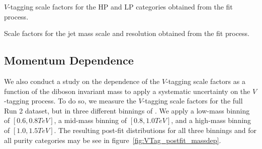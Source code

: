 \begin{table}[htbp]
  \centering
  
  \caption{
    $V$-tagging scale factors for the HP and LP categories obtained from the fit process.
  }
  \label{tab:VTagFactors}
\end{table}

\begin{table}[htbp]
  \centering
  
  \caption{
    Scale factors for the jet mass scale and resolution obtained from the fit process.
  }
  \label{tab:VScaleRes}
\end{table}

\subsection{Momentum Dependence}

We also conduct a study on the dependence of the $V$-tagging scale factors as a function of the diboson invariant mass \MVV to apply a systematic uncertainty on the $V$-tagging process.
To do so, we measure the $V$-tagging scale factors for the full Run 2 dataset, but in three different binnings of \MVV.
We apply a low-mass binning of $[0.6,0.8\unit{TeV}]$, a mid-mass binning of $[0.8,1.0\unit{TeV}]$, and a high-mass binning of $[1.0,1.5\unit{TeV}]$.
The resulting post-fit distributions for all three binnings and for all purity categories may be see in figure~\ref{fig:VTag_postfit_massdep}.

